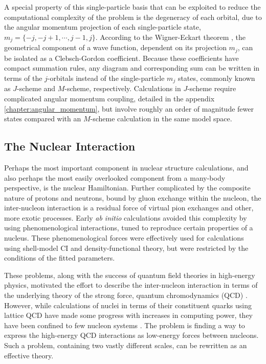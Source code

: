 \documentclass[thesis.tex]{subfiles}
\begin{document}
A special property of this single-particle basis that can be exploited to reduce the computational complexity of the problem is the degeneracy of each orbital, due to the angular momentum projection of each single-particle state, $m_{j} = \{ -j, -j+1, \cdots , j-1, j \}$.  According to the Wigner-Eckart theorem \cite{WIGNER1959,ECKART1930}, the geometrical component of a wave function, dependent on its projection $m_{j}$, can be isolated as a Clebsch-Gordon coefficient.  Because these coefficients have compact summation rules, any diagram and corresponding sum can be written in terms of the $j$-orbitals instead of the single-particle $m_{j}$ states, commonly known as $J$-scheme and $M$-scheme, respectively.  Calculations in $J$-scheme require complicated angular momentum coupling, detailed in the appendix \ref{chapter:angular_momentum}, but involve roughly an order of magnitude fewer states compared with an $M$-scheme calculation in the same model space.


\subsection{The Nuclear Interaction} \label{section:nuclear_interaction}

Perhaps the most important component in nuclear structure calculations, and also perhaps the most easily overlooked component from a many-body perspective, is the nuclear Hamiltonian.  Further complicated by the composite nature of protons and neutrons, bound by gluon exchange within the nucleon, the inter-nucleon interaction is a residual force of virtual pion exchanges and other, more exotic processes.  Early \emph{ab initio} calculations avoided this complexity by using phenomenological interactions, tuned to reproduce certain properties of a nucleus.  These phenomenological forces were effectively used for calculations using shell-model CI and density-functional theory, but were restricted by the conditions of the fitted parameters.

These problems, along with the success of quantum field theories in high-energy physics, motivated the effort to describe the inter-nucleon interaction in terms of the underlying theory of the strong force, quantum chromodynamics (QCD) \cite{HATSUDA1994221,LEPAGE1980}.  However, while calculations of nuclei in terms of their constituent quarks using lattice QCD have made some progress with increases in computing power, they have been confined to few nucleon systems \cite{BEANE2012}.  The problem is finding a way to express the high-energy QCD interactions as low-energy forces between nucleons.  Such a problem, containing two vastly different scales, can be rewritten as an effective theory.
\end{document}
